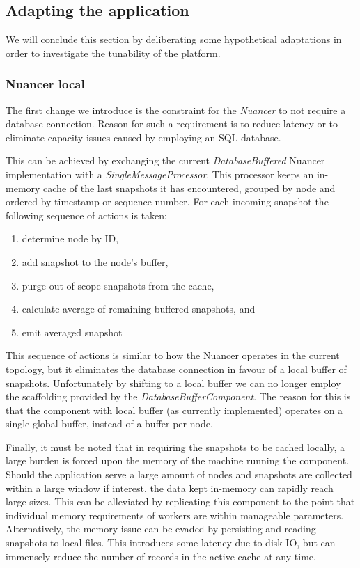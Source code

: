 \subsection{Adapting the application}
We will conclude this section by deliberating some hypothetical adaptations in order to investigate the tunability of the platform.

\subsubsection{Nuancer local}
The first change we introduce is the constraint for the \emph{Nuancer} to not require a database connection. Reason for such a requirement is to reduce latency or to eliminate capacity issues caused by employing an SQL database. 

This can be achieved by exchanging the current \emph{DatabaseBuffered} Nuancer implementation with a \emph{SingleMessageProcessor}. This processor keeps an in-memory cache of the last snapshots it has encountered, grouped by node and ordered by timestamp or sequence number. For each incoming snapshot the following sequence of actions is taken:
\begin{enumerate}
\nospace
\item determine node by ID,
\item add snapshot to the node's buffer,
\item purge out-of-scope snapshots from the cache,
\item calculate average of remaining buffered snapshots, and
\item emit averaged snapshot
\end{enumerate}
This sequence of actions is similar to how the Nuancer operates in the current topology, but it eliminates the database connection in favour of a local buffer of snapshots. Unfortunately by shifting to a local buffer we can no longer employ the scaffolding provided by the \emph{DatabaseBufferComponent}. The reason for this is that the component with local buffer (as currently implemented) operates on a single global buffer, instead of a buffer per node.

Finally, it must be noted that in requiring the snapshots to be cached locally, a large burden is forced upon the memory of the machine running the component. Should the application serve a large amount of nodes and snapshots are collected within a large window if interest, the data kept in-memory can rapidly reach large sizes. This can be alleviated by replicating this component to the point that individual memory requirements of workers are within manageable parameters. Alternatively, the memory issue can be evaded by persisting and reading snapshots to local files. This introduces some latency due to disk IO, but can immensely reduce the number of records in the active cache at any time.

